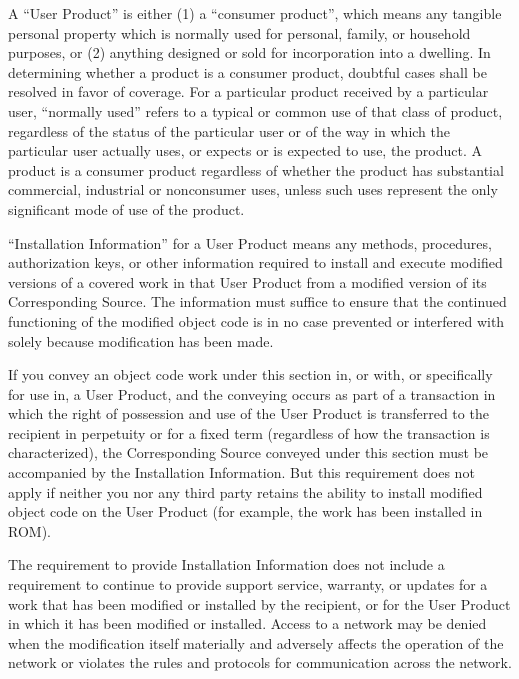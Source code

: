 \documentclass[letterpaper,10pt,english]{sphinxmanual}
\begin{document}
\begin{sphinxVerbatim}[commandchars=\\\{\}]
   A “User Product” is either (1) a “consumer product”, which means any
   tangible personal property which is normally used for personal, family, or
   household purposes, or (2) anything designed or sold for incorporation into
   a dwelling. In determining whether a product is a consumer product, doubtful
   cases shall be resolved in favor of coverage. For a particular product
   received by a particular user, “normally used” refers to a typical or common
   use of that class of product, regardless of the status of the particular
   user or of the way in which the particular user actually uses, or expects or
   is expected to use, the product. A product is a consumer product regardless
   of whether the product has substantial commercial, industrial or
   non\PYGZhy{}consumer uses, unless such uses represent the only significant mode of
   use of the product.

   “Installation Information” for a User Product means any methods, procedures,
   authorization keys, or other information required to install and execute
   modified versions of a covered work in that User Product from a modified
   version of its Corresponding Source. The information must suffice to ensure
   that the continued functioning of the modified object code is in no case
   prevented or interfered with solely because modification has been made.

   If you convey an object code work under this section in, or with, or
   specifically for use in, a User Product, and the conveying occurs as part of
   a transaction in which the right of possession and use of the User Product
   is transferred to the recipient in perpetuity or for a fixed term
   (regardless of how the transaction is characterized), the Corresponding
   Source conveyed under this section must be accompanied by the Installation
   Information. But this requirement does not apply if neither you nor any
   third party retains the ability to install modified object code on the User
   Product (for example, the work has been installed in ROM).

   The requirement to provide Installation Information does not include a
   requirement to continue to provide support service, warranty, or updates for
   a work that has been modified or installed by the recipient, or for the User
   Product in which it has been modified or installed. Access to a network may
   be denied when the modification itself materially and adversely affects the
   operation of the network or violates the rules and protocols for
   communication across the network.


\end{sphinxVerbatim}
\end{document}
